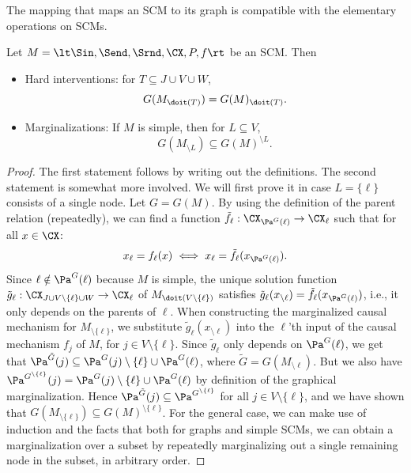 The mapping that maps an SCM to its graph is compatible with the elementary operations on SCMs.
\begin{Prp}\label{prp:compatibility_graph}
  Let $M = \lt \Sin, \Send, \Srnd, \CX, P, f \rt$ be an SCM. Then
  \begin{itemize}
    \item Hard interventions: for $T \subseteq J \cup V \cup W$, 
      $$G(M_{\doit(T)}) = G(M)_{\doit(T)}.$$
    \item Marginalizations: If $M$ is simple, then for $L \subseteq V$, 
      $$G(M_{\setminus L}) \subseteq G(M)^{\setminus L}.$$
  \end{itemize}
\end{Prp}
\begin{proof}
  The first statement follows by writing out the definitions. The second statement is somewhat more involved. We will
  first prove it in case $L = \{\ell\}$ consists of a single node. 
  Let $G = G(M)$.
  By using the definition of the parent relation (repeatedly), we can find a function $\tilde{f}_\ell : \CX_{\Pa^G(\ell)} \to \CX_\ell$ such that
  for all $x \in \CX$:
  $$x_\ell = f_\ell(x) \iff x_\ell = \tilde{f}_\ell(x_{\Pa^G(\ell)}).$$
  Since $\ell \notin \Pa^G(\ell)$ because $M$ is simple, %
  the unique solution function
  $\tilde{g}_\ell : \CX_{J \cup V \setminus \{\ell\} \cup W} \to \CX_\ell$ of $M_{\doit(V\setminus \{\ell\})}$
  satisfies $\tilde{g}_\ell(x_{\setminus \ell}) = \tilde{f}_\ell(x_{\Pa^G(\ell)})$, i.e., it only depends on the parents of $\ell$.
  When constructing the marginalized causal mechanism for $M_{\setminus \{\ell\}}$, we substitute 
  $\tilde{g}_\ell(x_{\setminus \ell})$ into the $\ell$'th input of the causal mechanism $f_j$ of $M$, for $j \in V\setminus \{\ell\}$.
  Since $\tilde{g}_\ell$ only depends on $\Pa^G(\ell)$,
  we get that $\Pa^{\tilde G}(j) \subseteq \Pa^G(j) \setminus \{\ell\} \cup \Pa^G(\ell)$, where $\tilde{G} = G(M_{\setminus \ell})$.
  But we also have $\Pa^{G^{\setminus \{\ell\}}}(j) = \Pa^G(j) \setminus \{\ell\} \cup \Pa^G(\ell)$ by definition of the graphical marginalization. 
  Hence $\Pa^{\tilde G}(j) \subseteq \Pa^{G^{\setminus \{\ell\}}}$ for all $j \in V\setminus \{\ell\}$, and we have shown that $G(M_{\setminus \{\ell\}}) \subseteq G(M)^{\setminus \{\ell\}}$.
  For the general case, we can make use of induction and the facts that both for
  graphs and simple SCMs, we can obtain a marginalization over a subset by repeatedly marginalizing out a single remaining node in the subset, in arbitrary order.
\end{proof}

